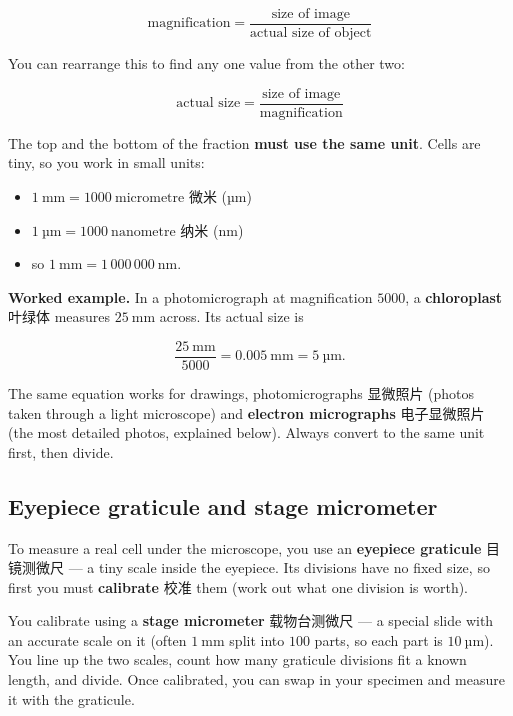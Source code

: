 \documentclass[11pt]{article}
\begin{document}
\[
\text{magnification} = \frac{\text{size of image}}{\text{actual size of object}}
\]

You can rearrange this to find any one value from the other two:

\[
\text{actual size} = \frac{\text{size of image}}{\text{magnification}}
\]

The top and the bottom of the fraction \textbf{must use the same unit}. Cells are tiny, so you work in small units:

\begin{itemize}
\item $1\ \text{mm} = 1000\ \text{micrometre}$ 微米 (µm)

\item $1\ \text{µm} = 1000\ \text{nanometre}$ 纳米 (nm)

\item so $1\ \text{mm} = 1\,000\,000\ \text{nm}$.

\end{itemize}

\textbf{Worked example.} In a photomicrograph at magnification $5000$, a \textbf{chloroplast} 叶绿体 measures $25\ \text{mm}$ across. Its actual size is

\[
\frac{25\ \text{mm}}{5000} = 0.005\ \text{mm} = 5\ \text{µm}.
\]

The same equation works for drawings, photomicrographs 显微照片 (photos taken through a light microscope) and \textbf{electron micrographs} 电子显微照片 (the most detailed photos, explained below). Always convert to the same unit first, then divide.

\subsection*{Eyepiece graticule and stage micrometer}

To measure a real cell under the microscope, you use an \textbf{eyepiece graticule} 目镜测微尺 — a tiny scale inside the eyepiece. Its divisions have no fixed size, so first you must \textbf{calibrate} 校准 them (work out what one division is worth).

You calibrate using a \textbf{stage micrometer} 载物台测微尺 — a special slide with an accurate scale on it (often $1\ \text{mm}$ split into $100$ parts, so each part is $10\ \text{µm}$). You line up the two scales, count how many graticule divisions fit a known length, and divide. Once calibrated, you can swap in your specimen and measure it with the graticule.
\end{document}
